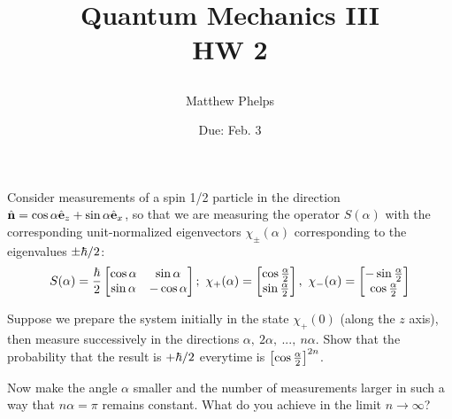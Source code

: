 \documentclass[10pt,letterpaper]{article}
\title{\begin{spacing}{1.2}Quantum Mechanics III\\HW 2\end{spacing}}
\author{Matthew Phelps}
\date{Due: Feb. 3 }
\begin{document}
\maketitle

\benum
  	 \item[1.12]
	 
	Consider measurements of a spin 1/2 particle in the direction $\hat{\mathbf{n}} = \cos\alpha \hat{\mathbf{e}}_z + \sin\alpha 
	\hat{\mathbf{e}}_x$, so that we are measuring the operator $S(\alpha)$ with the corresponding
	unit-normalized eigenvectors $\chi_\pm(\alpha)$ corresponding to the eigenvalues $\pm \hbar/2$:
	\[
		S(\alpha) = \frac{\h}{2}\bbm \cos\alpha & \sin\alpha \\ \sin\alpha & -\cos\alpha\ebm;\ 
		\chi_+(\alpha) = \bbm \cos\frac{\alpha}{2} \\ \sin\frac{\alpha}{2} \ebm,\ 
		\chi_-(\alpha) = \bbm -\sin\frac{\alpha}{2} \\ \cos\frac{\alpha}{2} \ebm
	\]
	
	\benum
	\item
	Suppose we prepare the system initially in the state $\chi_+(0)$ (along the $z$ axis), then measure
	successively in the directions $\alpha,\ 2\alpha,\ ...,\ n\alpha$. Show that the probability that the result is 
	$+\hbar/2$ everytime is $\left[\cos\frac{\alpha}{2}\right]^{2n}$. 
	\item
	Now make the angle $\alpha$ smaller and the number of measurements larger in such a way
	that $n\alpha = \pi$ remains constant. What do you achieve in the limit $n\to\infty$?
	\\ \\
	\eenum
	
\end{document}
